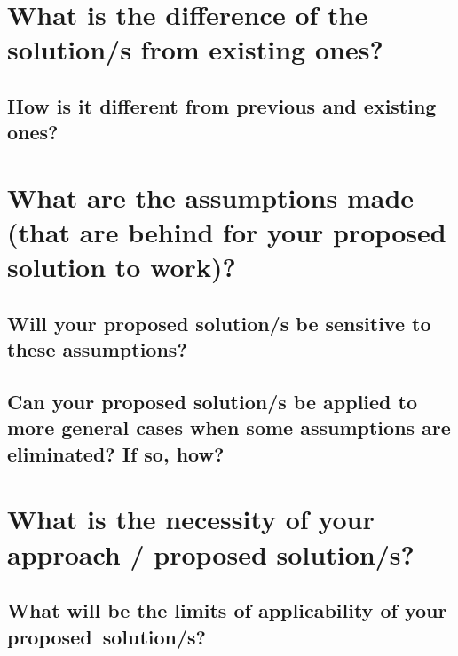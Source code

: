 	
\section*{\thesection\quad What is the difference of the solution/s from existing ones?}
	
\graytx{\blindtext}

\subsection*{\thesubsection\quad How is it different from previous and existing ones?}

\graytx{\blindtext}
	
	
	
	
	
	
\section*{\thesection\quad What are the assumptions made (that are behind for your proposed solution to work)?}
	
\graytx{\blindtext}
		
	
\subsection*{\thesubsection\quad Will your proposed solution/s be sensitive to these assumptions?}
	
\graytx{\blindtext}

  
\subsection*{\thesubsection\quad Can your proposed solution/s be applied to more general cases when some assumptions are eliminated? If so, how?}

\graytx{\blindtext}






\section*{\thesection\quad What is the necessity of your approach / proposed solution/s?}

\graytx{\blindtext}
	
	
\subsection*{\thesubsection\quad What will be the limits of applicability of your proposed~solution/s?}

